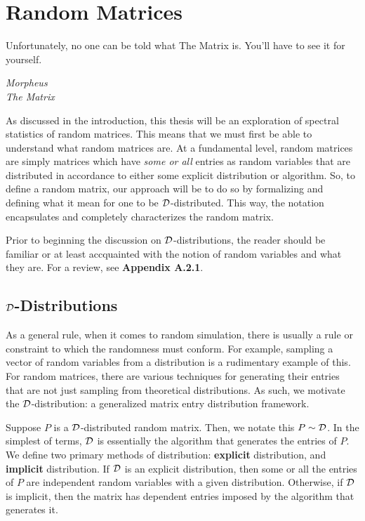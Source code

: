 
\chapter{Random Matrices}

\epigraph{Unfortunately, no one can be told what The Matrix is. You'll have to see it for yourself.}{\textit{Morpheus \\ The Matrix}}

As discussed in the introduction, this thesis will be an exploration of spectral statistics of random matrices. This means that we must first be able to understand what random matrices are.
At a fundamental level, random matrices are simply matrices which have \textit{some or all} entries as random variables that are distributed in accordance to either some explicit distribution or algorithm.
So, to define a random matrix, our approach will be to do so by formalizing and defining what it mean for one to be $\D$-distributed.
This way, the notation encapsulates and completely characterizes the random matrix.

Prior to beginning the discussion on $\D$-distributions, the reader should be familiar or at least accquainted with the notion of random variables and what they are.
For a review, see \textbf{Appendix A.2.1}.


\section{$\D$-Distributions}

As a general rule, when it comes to random simulation, there is usually a rule or constraint to which the randomness must conform.
For example, sampling a vector of random variables from a distribution is a rudimentary example of this.
For random matrices, there are various techniques for generating their entries that are not just sampling from theoretical distributions.
As such, we motivate the $\D$-distribution: a generalized matrix entry distribution framework.

\begin{definition}[$\D$-distribution]
Suppose $P$ is a $\D$-distributed random matrix. Then, we notate this $P \sim \mathcal{D}$. In the simplest of terms, $\D$ is essentially the algorithm that generates the entries of $P$.
We define two primary methods of distribution: \textbf{explicit} distribution, and \textbf{implicit} distribution.
If $\D$ is an explicit distribution, then some or all the entries of $P$ are independent random variables with a given distribution.
Otherwise, if $\D$ is implicit, then the matrix has dependent entries imposed by the algorithm that generates it.
\end{definition}

